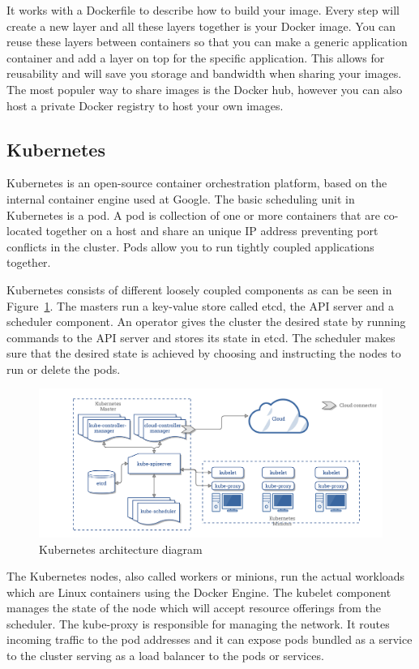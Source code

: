 It works with a Dockerfile to describe how to build your image. Every step will create a new layer and all these layers together is your Docker image. You can reuse these layers between containers so that you can make a generic application container and add a layer on top for the specific application. This allows for reusability and will save you storage and bandwidth when sharing your images. The most populer way to share images is the Docker hub, however you can also host a private Docker registry to host your own images.

\subsection{Kubernetes}
\label{subsec:kubernetes}
Kubernetes is an open-source container orchestration platform, based on the internal container engine used at Google. The basic scheduling unit in Kubernetes is a pod. A pod is collection of one or more containers that are co-located together on a host and share an unique IP address preventing port conflicts in the cluster. Pods allow you to run tightly coupled applications together.

Kubernetes consists of different loosely coupled components as can be seen in Figure~\ref{fig:k8s-arch}. The masters run a key-value store called etcd\cite{etcd}, the API server and a scheduler component. An operator gives the cluster the desired state by running commands to the API server and stores its state in etcd. The scheduler makes sure that the desired state is achieved by choosing and instructing the nodes to run or delete the pods.

\begin{figure}
    \centering
    \includegraphics[width=1\columnwidth]{images/k8s-arch}
    \caption{Kubernetes architecture diagram\cite{k8s_arch}}
    \label{fig:k8s-arch}
\end{figure}

The Kubernetes nodes, also called workers or minions, run the actual workloads which are Linux containers using the Docker Engine. The kubelet component manages the state of the node which will accept resource offerings from the scheduler. The kube-proxy is responsible for managing the network. It routes incoming traffic to the pod addresses and it can expose pods bundled as a service to the cluster serving as a load balancer to the pods or services. 

